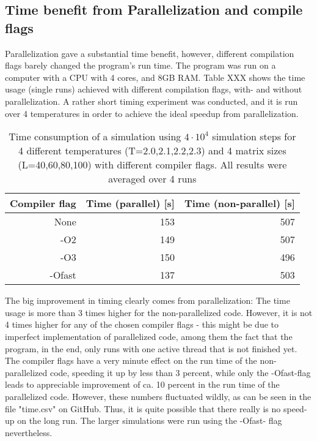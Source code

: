 \documentclass[10pt,a4paper]{article}
\begin{document}
\subsection{Time benefit from Parallelization and compile flags}
Parallelization gave a substantial time benefit, however, different compilation flags barely changed the program's run time. The program was run on a computer with a CPU with 4 cores, and 8GB RAM. Table XXX shows the time usage (single runs) achieved with different compilation flags, with- and without parallelization. A rather short timing experiment was conducted, and it is run over 4 temperatures in order to achieve the ideal speedup from parallelization.
\begin{table}[H]
\centering
\caption[Time usage parallel/non-parallel, compilation flags]{Time consumption of a simulation using $4\cdot10^4$ simulation steps for 4 different temperatures (T=2.0,2.1,2.2,2.3) and 4 matrix sizes (L=40,60,80,100) with different compiler flags. All results were averaged over 4 runs}
\centering
\begin{tabular}{|r|r|r|}
\hline
Compiler flag & Time (parallel) [s] & Time (non-parallel) [s] \\ \hline
None             & 153                 & 507                     \\ \hline
-O2              & 149                 & 507                     \\ \hline
-O3              & 150                 & 496                     \\ \hline
-Ofast           & 137                 & 503                     \\ \hline
\end{tabular}
\end{table}
The big improvement in timing clearly comes from parallelization: The time usage is more than 3 times higher for the non-parallelized code. However, it is not 4 times higher for any of the chosen compiler flags - this might be due to imperfect implementation of parallelized code, among them the fact that the program, in the end, only runs with one active thread that is not finished yet. The compiler flags have a very minute effect on the run time of the non-parallelized code, speeding it up by less than 3 percent, while only the -Ofast-flag leads to appreciable improvement of ca. 10 percent in the run time of the parallelized code. However, these numbers fluctuated wildly, as can be seen in the file "time.csv" on GitHub. Thus, it is quite possible that there really is no speed-up on the long run. The larger simulations were run using the -Ofast- flag nevertheless.
\end{document}
